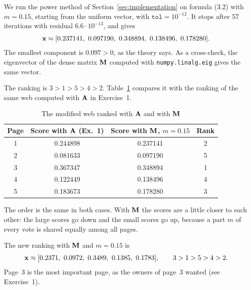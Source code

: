 
We run the power method of Section~\ref{sec:implementation} on formula (3.2) with $m = 0.15$, starting from the uniform vector, with $\texttt{tol} = 10^{-12}$.
It stops after 57 iterations with residual $6.6\cdot10^{-13}$, and gives
\[
  \vx \approx [0.237141,\ 0.097190,\ 0.348894,\ 0.138496,\ 0.178280] .
\]
The smallest component is $0.097 > 0$, as the theory says.
As a cross-check, the eigenvector of the dense matrix $\mathbf{M}$ computed with \texttt{numpy.linalg.eig} gives the same vector.

The ranking is $3 > 1 > 5 > 4 > 2$.
Table~\ref{tab:ex11} compares it with the ranking of the same web computed with $\mathbf{A}$ in Exercise~1.

\begin{table}[H]\centering
\begin{tabular}{cccc}
\toprule
\textbf{Page} & \textbf{Score with $\mathbf{A}$ (Ex.~1)} & \textbf{Score with $\mathbf{M}$, $m=0.15$} & \textbf{Rank} \\
\midrule
1 & 0.244898 & 0.237141 & 2 \\
2 & 0.081633 & 0.097190 & 5 \\
3 & 0.367347 & 0.348894 & 1 \\
4 & 0.122449 & 0.138496 & 4 \\
5 & 0.183673 & 0.178280 & 3 \\
\bottomrule
\end{tabular}
\caption{The modified web ranked with $\mathbf{A}$ and with $\mathbf{M}$}
\label{tab:ex11}
\end{table}

The order is the same in both cases.
With $\mathbf{M}$ the scores are a little closer to each other: the large scores go down and the small scores go up, because a part $m$ of every vote is shared equally among all pages.


The new ranking with $\mathbf{M}$ and $m = 0.15$ is
\[
  \vx \approx [0.2371,\ 0.0972,\ 0.3489,\ 0.1385,\ 0.1783], \qquad 3 > 1 > 5 > 4 > 2 .
\]
Page~3 is the most important page, as the owners of page~3 wanted (see Exercise~1).
